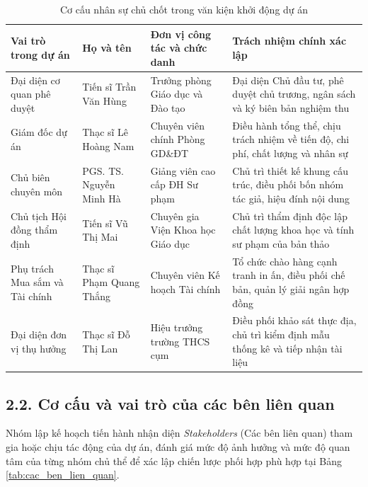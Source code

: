 \begin{table}[htbp]
\centering
\caption{Cơ cấu nhân sự chủ chốt trong văn kiện khởi động dự án}
\label{tab:nhan_su_chu_chot}
\begin{tabularx}{\textwidth}{L{3.2cm}L{3.5cm}L{3.5cm}Y}
\toprule
\textbf{Vai trò trong dự án} & \textbf{Họ và tên} & \textbf{Đơn vị công tác và chức danh} & \textbf{Trách nhiệm chính xác lập} \\
\midrule
Đại diện cơ quan phê duyệt & Tiến sĩ Trần Văn Hùng & Trưởng phòng Giáo dục và Đào tạo & Đại diện Chủ đầu tư, phê duyệt chủ trương, ngân sách và ký biên bản nghiệm thu \\
Giám đốc dự án & Thạc sĩ Lê Hoàng Nam & Chuyên viên chính Phòng GD\&ĐT & Điều hành tổng thể, chịu trách nhiệm về tiến độ, chi phí, chất lượng và nhân sự \\
Chủ biên chuyên môn & PGS. TS. Nguyễn Minh Hà & Giảng viên cao cấp ĐH Sư phạm & Chủ trì thiết kế khung cấu trúc, điều phối bốn nhóm tác giả, hiệu đính nội dung \\
Chủ tịch Hội đồng thẩm định & Tiến sĩ Vũ Thị Mai & Chuyên gia Viện Khoa học Giáo dục & Chủ trì thẩm định độc lập chất lượng khoa học và tính sư phạm của bản thảo \\
Phụ trách Mua sắm và Tài chính & Thạc sĩ Phạm Quang Thắng & Chuyên viên Kế hoạch Tài chính & Tổ chức chào hàng cạnh tranh in ấn, điều phối chế bản, quản lý giải ngân hợp đồng \\
Đại diện đơn vị thụ hưởng & Thạc sĩ Đỗ Thị Lan & Hiệu trưởng trường THCS cụm & Điều phối khảo sát thực địa, chủ trì kiểm định mẫu thống kê và tiếp nhận tài liệu \\
\bottomrule
\end{tabularx}
\end{table}

\subsection*{2.2. Cơ cấu và vai trò của các bên liên quan}

Nhóm lập kế hoạch tiến hành nhận diện \textit{Stakeholders} (Các bên liên quan) tham gia hoặc chịu tác động của dự án, đánh giá mức độ ảnh hưởng và mức độ quan tâm của từng nhóm chủ thể để xác lập chiến lược phối hợp phù hợp tại Bảng \ref{tab:cac_ben_lien_quan}.

